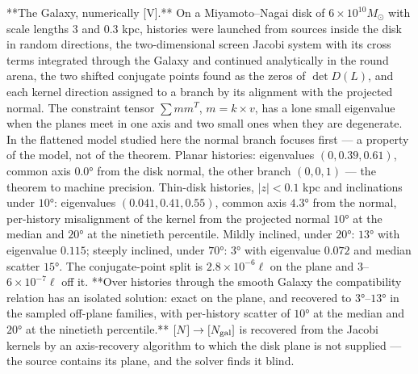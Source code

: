 **The Galaxy, numerically [V].** On a Miyamoto–Nagai disk of $6\times10^{10}M_\odot$ with scale lengths $3$ and $0.3$ kpc, histories were launched from sources inside the disk in random directions, the two-dimensional screen Jacobi system with its cross terms integrated through the Galaxy and continued analytically in the round arena, the two shifted conjugate points found as the zeros of $\det D(L)$, and each kernel direction assigned to a branch by its alignment with the projected normal. The constraint tensor $\sum m m^T$, $m = k\times v$, has a lone small eigenvalue when the planes meet in one axis and two small ones when they are degenerate. In the flattened model studied here the normal branch focuses first — a property of the model, not of the theorem. Planar histories: eigenvalues $(0,0.39,0.61)$, common axis $0.0°$ from the disk normal, the other branch $(0,0,1)$ — the theorem to machine precision. Thin-disk histories, $|z|<0.1$ kpc and inclinations under $10°$: eigenvalues $(0.041,0.41,0.55)$, common axis $4.3°$ from the normal, per-history misalignment of the kernel from the projected normal $10°$ at the median and $20°$ at the ninetieth percentile. Mildly inclined, under $20°$: $13°$ with eigenvalue $0.115$; steeply inclined, under $70°$: $3°$ with eigenvalue $0.072$ and median scatter $15°$. The conjugate-point split is $2.8\times10^{-6}\ell$ on the plane and $3$–$6\times10^{-7}\ell$ off it. **Over histories through the smooth Galaxy the compatibility relation has an isolated solution: exact on the plane, and recovered to $3°$–$13°$ in the sampled off-plane families, with per-history scatter of $10°$ at the median and $20°$ at the ninetieth percentile.** $[N]\to[N_{\rm gal}]$ is recovered from the Jacobi kernels by an axis-recovery algorithm to which the disk plane is not supplied — the source contains its plane, and the solver finds it blind.

